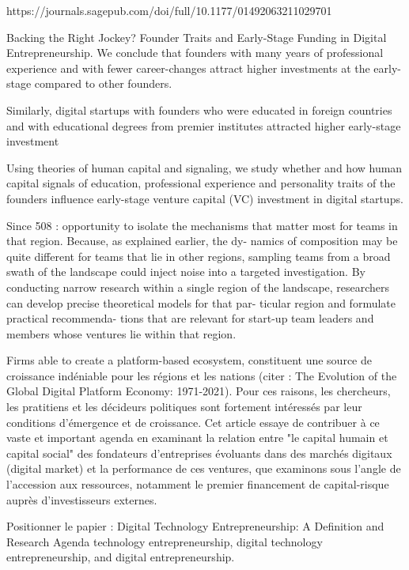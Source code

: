 \documentclass[11pt]{article}
\begin{document}
https://journals.sagepub.com/doi/full/10.1177/01492063211029701


Backing the Right Jockey? Founder Traits and Early-Stage Funding in Digital Entrepreneurship.
We conclude that founders with many years of professional experience and with fewer career-changes attract higher investments at the early-stage compared to other founders.

Similarly, digital startups with founders who were educated in foreign countries and with educational degrees from premier institutes attracted higher early-stage investment

Using theories of human capital and signaling, we study whether and how human capital signals of education, professional experience and personality traits of the founders influence early-stage venture capital (VC) investment in digital startups.

Since 508 : opportunity to isolate the mechanisms that matter most for teams in that region. Because, as explained earlier, the dy- namics of composition may be quite different for teams that lie in other regions, sampling teams from a broad swath of the landscape could inject noise into a targeted investigation. By conducting narrow research within a single region of the landscape, researchers can develop precise theoretical models for that par- ticular region and formulate practical recommenda- tions that are relevant for start-up team leaders and members whose ventures lie within that region.

Firms able to create a platform-based ecosystem, constituent une source de croissance indéniable pour les régions et les nations (citer : The Evolution of the Global Digital Platform Economy: 1971-2021). Pour ces raisons, les chercheurs, les pratitiens et les décideurs politiques sont fortement intéressés par leur conditions d'émergence et de croissance. Cet article essaye de contribuer à ce vaste et important agenda en examinant la relation entre "le capital humain et capital social" des fondateurs d'entreprises évoluants dans des marchés digitaux (digital market) et la performance de ces ventures, que examinons sous l'angle de l'accession aux ressources, notamment le premier financement de capital-risque auprès d'investisseurs externes.

Positionner le papier :
Digital Technology Entrepreneurship: A Definition and Research Agenda
technology entrepreneurship, digital technology entrepreneurship, and digital entrepreneurship.
\end{document}
